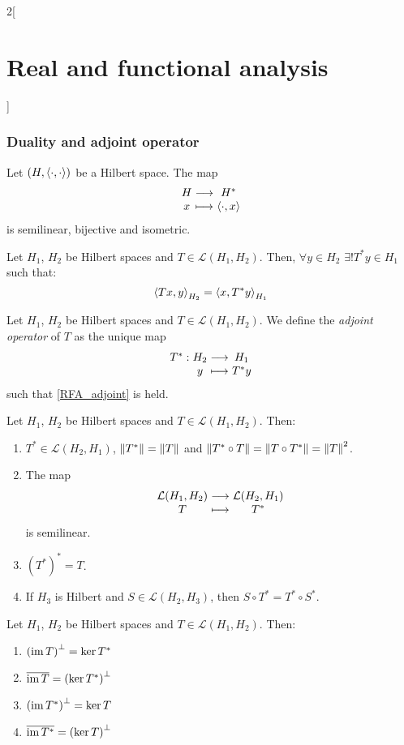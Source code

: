 \documentclass[../../../main_math.tex]{subfiles}
\begin{document}
\begin{multicols}{2}[\section{Real and functional analysis}]
  \subsubsection{Duality and adjoint operator}
  \begin{theorem}
    Let $(H,{\left\langle\cdot,\cdot\right\rangle})$ be a Hilbert space. The map $$\function{}{H}{H^*}{x}{\dotp{\cdot}{x}}$$ is semilinear, bijective and isometric.
  \end{theorem}
  \begin{corollary}
    Let $H_1$, $H_2$ be Hilbert spaces and $T\in\mathcal{L}(H_1,H_2)$. Then, $\forall y\in H_2$ $\exists! T^*y\in H_1$ such that:
    \begin{equation}\label{RFA_adjoint}
      {\left\langle Tx,y\right\rangle}_{H_2}={\left\langle x,T^*y\right\rangle}_{H_1}
    \end{equation}
  \end{corollary}
  \begin{definition}
    Let $H_1$, $H_2$ be Hilbert spaces and $T\in\mathcal{L}(H_1,H_2)$. We define the \emph{adjoint operator} of $T$ as the unique map $$\function{T^*}{H_2}{H_1}{y}{T ^*y}$$ such that \cref{RFA_adjoint} is held.
  \end{definition}
  \begin{proposition}
    Let $H_1$, $H_2$ be Hilbert spaces and $T\in\mathcal{L}(H_1,H_2)$. Then:
    \begin{enumerate}
      \item $T^*\in\mathcal{L}(H_2,H_1)$, $\left\|T^*\right\|=\left\|T\right\|$ and $\left\|T^*\circ T\right\|=\left\|T\circ T^*\right\|=\left\|T\right\|^2$.
      \item The map $$\function{}{\mathcal{L}(H_1,H_2)}{\mathcal{L}(H_2,H_1)}{T}{T^*}$$ is semilinear.
      \item ${(T^*)}^* = T$.
      \item If $H_3$ is Hilbert and $S\in\mathcal{L}(H_2,H_3)$, then ${S\circ T}^*=T^*\circ S^*$.
    \end{enumerate}
  \end{proposition}
  \begin{proposition}
    Let $H_1$, $H_2$ be Hilbert spaces and $T\in\mathcal{L}(H_1,H_2)$. Then:
    \begin{enumerate}
      \item ${(\operatorname{im} T)}^\perp =\ker T^*$
      \item $\overline{\operatorname{im} T} = {(\ker T^*)}^\perp$
      \item ${(\operatorname{im} T^*)}^\perp =\ker T$
      \item $\overline{\operatorname{im} T^*} = {(\ker T)}^\perp$

\end{enumerate}
\end{proposition}
\end{multicols}
\end{document}
